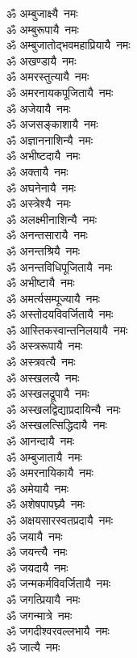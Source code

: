 \begin{flushleft}
\begin{multicols}{2}
ॐ अम्बुजाक्ष्यै~नमः\\
ॐ अम्बुरूपायै~नमः\\
ॐ अम्बुजातोद्भवमहाप्रियायै~नमः\\
ॐ अखण्डायै~नमः\\
ॐ अमरस्तुत्यायै~नमः\\
ॐ अमरनायकपूजितायै~नमः\\
ॐ अजेयायै~नमः\hfill{}\\
ॐ अजसङ्काशायै~नमः\\
ॐ अज्ञाननाशिन्यै~नमः\\
ॐ अभीष्टदायै~नमः\\
ॐ अक्तायै~नमः\\
ॐ अघनेनायै~नमः\\
ॐ अस्त्रेश्यै~नमः\\
ॐ अलक्ष्मीनाशिन्यै~नमः\\
ॐ अनन्तसारायै~नमः\\
ॐ अनन्तश्रियै~नमः\\
ॐ अनन्तविधिपूजितायै~नमः\hfill{}\\
ॐ अभीष्टायै~नमः\\
ॐ अमर्त्यसम्पूज्यायै~नमः\\
ॐ अस्तोदयविवर्जितायै~नमः\\
ॐ आस्तिकस्वान्तनिलयायै~नमः\\
ॐ अस्त्ररूपायै~नमः\\
ॐ अस्त्रवत्यै~नमः\\
ॐ अस्खलत्यै~नमः\\
ॐ अस्खलद्रूपायै~नमः\\
ॐ अस्खलद्विद्याप्रदायिन्यै~नमः\\
ॐ अस्खलत्सिद्धिदायै~नमः\hfill{}\\
ॐ आनन्दायै~नमः\\
ॐ अम्बुजातायै~नमः\\
ॐ अमरनायिकायै~नमः\\
ॐ अमेयायै~नमः\\
ॐ अशेषपापघ्न्यै~नमः\\
ॐ अक्षयसारस्वतप्रदायै~नमः\\
ॐ जयायै~नमः\\
ॐ जयन्त्यै~नमः\\
ॐ जयदायै~नमः\\
ॐ जन्मकर्मविवर्जितायै~नमः\hfill{}\\
ॐ जगत्प्रियायै~नमः\\
ॐ जगन्मात्रे~नमः\\
ॐ जगदीश्वरवल्लभायै~नमः\\
ॐ जात्यै~नमः\\

\end{multicols}
\end{flushleft}

